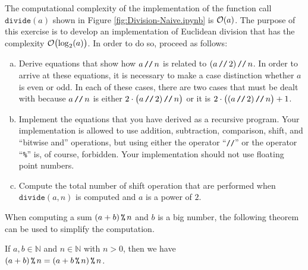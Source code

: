 \exercise
The computational complexity of the implementation of the function call $\texttt{divide}(a)$ shown in Figure
\ref{fig:Division-Naive.ipynb} is $\mathcal{O}(a)$.  The purpose of this exercise is to develop an implementation of
Euclidean division that has the complexity $\mathcal{O}\bigl(\log_2(a)\bigr)$.  In order to do so, proceed as follows:
\begin{enumerate}[(a)]
\item Derive equations that show how $a \,\texttt{//}\, n$ is related to $(a \,\texttt{//}\, 2) \,\texttt{//}\, n$.
      In order to arrive at these equations, it is necessary to make a case distinction whether $a$ is even or
      odd. In each of these cases, there are two cases that must be dealt with because
      $a \,\texttt{//}\, n$ is either $2 \cdot \bigl(a \,\texttt{//}\, 2) \,\texttt{//}\, n\bigr)$ or it is 
      $2 \cdot \bigl((a \,\texttt{//}\, 2) \,\texttt{//}\, n\bigr) + 1$.
\item Implement the equations that you have derived as a recursive program.  Your implementation is allowed to
      use addition, subtraction, comparison, shift, and ``bitwise and'' operations, but using either the operator
      ``\texttt{//}'' or the operator ``\texttt{\%}'' 
      is, of course, forbidden.  Your implementation should not use floating point numbers.
\item Compute the total number of shift operation that are performed when $\texttt{divide}(a, n)$ is computed
      and $a$ is a power of $2$. \eox
\end{enumerate}


When computing a sum $(a + b) \,\texttt{\%}\, n$ and $b$ is a big number, the following theorem can be used to simplify
the computation.

\begin{Theorem}
  If $a, b \in \mathbb{N}$ and $n \in \mathbb{N}$ with $n > 0$, then we have
  \\[0.2cm]
  \hspace*{1.3cm}
  $\displaystyle (a + b) \,\texttt{\%}\, n = (a + b \,\texttt{\%}\, n) \,\texttt{\%}\, n$.
\end{Theorem}

